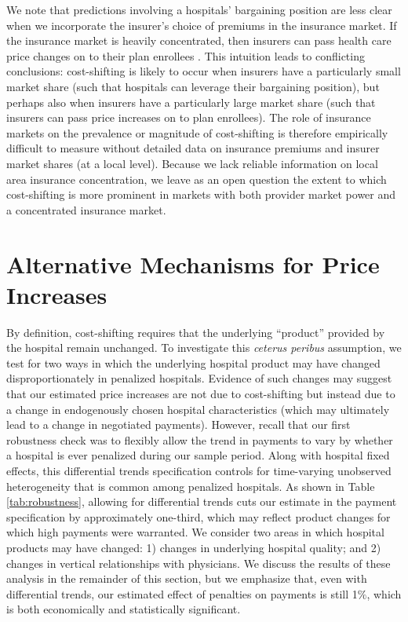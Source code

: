 \documentclass[12pt]{article}
\begin{document}
We note that predictions involving a hospitals' bargaining position are less clear when we incorporate the insurer's choice of premiums in the insurance market. If the insurance market is heavily concentrated, then insurers can pass health care price changes on to their plan enrollees \citep{trish2015,ho2017}. This intuition leads to conflicting conclusions: cost-shifting is likely to occur when insurers have a particularly small market share (such that hospitals can leverage their bargaining position), but perhaps also when insurers have a particularly large market share (such that insurers can pass price increases on to plan enrollees). The role of insurance markets on the prevalence or magnitude of cost-shifting is therefore empirically difficult to measure without detailed data on insurance premiums and insurer market shares (at a local level). Because we lack reliable information on local area insurance concentration, we leave as an open question the extent to which cost-shifting is more prominent in markets with both provider market power and a concentrated insurance market.


\section{Alternative Mechanisms for Price Increases}
\label{sec:alt}
By definition, cost-shifting requires that the underlying ``product'' provided by the hospital remain unchanged. To investigate this \textit{ceterus peribus} assumption, we test for two ways in which the underlying hospital product may have changed disproportionately in penalized hospitals. Evidence of such changes may suggest that our estimated price increases are not due to cost-shifting but instead due to a change in endogenously chosen hospital characteristics (which may ultimately lead to a change in negotiated payments).  However, recall that our first robustness check was to flexibly allow the trend in payments to vary by whether a hospital is ever penalized during our sample period.   Along with hospital fixed effects, this differential trends specification controls for time-varying unobserved heterogeneity that is common among penalized hospitals.  As shown in Table \ref{tab:robustness}, allowing for differential trends cuts our estimate in the payment specification by approximately one-third, which may reflect product changes for which high payments were warranted.  We consider two areas in which hospital products may have changed: 1) changes in underlying hospital quality; and 2) changes in vertical relationships with physicians. We discuss the results of these analysis in the remainder of this section, but we emphasize that, even with differential trends, our estimated effect of penalties on payments is still 1$\%$, which is both economically and statistically significant.  
\end{document}
